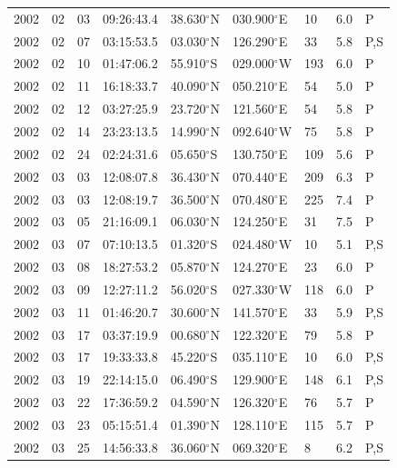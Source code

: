 \documentclass[12pt,twoside]{article}
\begin{document}
\begin{longtable}{|l|l|l|l|l|l|l|l|l|}
2002 & 02 & 03 & 09:26:43.4 & 38.630$^{\circ}$N & 030.900$^{\circ}$E &  10 & 6.0 & P   \\
2002 & 02 & 07 & 03:15:53.5 & 03.030$^{\circ}$N & 126.290$^{\circ}$E &  33 & 5.8 & P,S \\
2002 & 02 & 10 & 01:47:06.2 & 55.910$^{\circ}$S  & 029.000$^{\circ}$W & 193 & 6.0 & P   \\
2002 & 02 & 11 & 16:18:33.7 & 40.090$^{\circ}$N & 050.210$^{\circ}$E &  54 & 5.0 & P   \\
2002 & 02 & 12 & 03:27:25.9 & 23.720$^{\circ}$N & 121.560$^{\circ}$E &  54 & 5.8 & P   \\
2002 & 02 & 14 & 23:23:13.5 & 14.990$^{\circ}$N & 092.640$^{\circ}$W &  75 & 5.8 & P   \\
2002 & 02 & 24 & 02:24:31.6 & 05.650$^{\circ}$S  & 130.750$^{\circ}$E & 109 & 5.6 & P   \\
2002 & 03 & 03 & 12:08:07.8 & 36.430$^{\circ}$N & 070.440$^{\circ}$E & 209 & 6.3 & P   \\
2002 & 03 & 03 & 12:08:19.7 & 36.500$^{\circ}$N & 070.480$^{\circ}$E & 225 & 7.4 & P   \\
2002 & 03 & 05 & 21:16:09.1 & 06.030$^{\circ}$N & 124.250$^{\circ}$E &  31 & 7.5 & P   \\
2002 & 03 & 07 & 07:10:13.5 & 01.320$^{\circ}$S  & 024.480$^{\circ}$W &  10 & 5.1 & P,S \\
2002 & 03 & 08 & 18:27:53.2 & 05.870$^{\circ}$N & 124.270$^{\circ}$E &  23 & 6.0 & P   \\
2002 & 03 & 09 & 12:27:11.2 & 56.020$^{\circ}$S  & 027.330$^{\circ}$W & 118 & 6.0 & P   \\
2002 & 03 & 11 & 01:46:20.7 & 30.600$^{\circ}$N & 141.570$^{\circ}$E &  33 & 5.9 & P,S \\
2002 & 03 & 17 & 03:37:19.9 & 00.680$^{\circ}$N & 122.320$^{\circ}$E &  79 & 5.8 & P   \\
2002 & 03 & 17 & 19:33:33.8 & 45.220$^{\circ}$S  & 035.110$^{\circ}$E &  10 & 6.0 & P,S \\
2002 & 03 & 19 & 22:14:15.0 & 06.490$^{\circ}$S  & 129.900$^{\circ}$E & 148 & 6.1 & P,S \\
2002 & 03 & 22 & 17:36:59.2 & 04.590$^{\circ}$N & 126.320$^{\circ}$E &  76 & 5.7 & P   \\
2002 & 03 & 23 & 05:15:51.4 & 01.390$^{\circ}$N & 128.110$^{\circ}$E & 115 & 5.7 & P   \\
2002 & 03 & 25 & 14:56:33.8 & 36.060$^{\circ}$N & 069.320$^{\circ}$E &   8 & 6.2 & P,S \\

\end{longtable}
\end{document}
